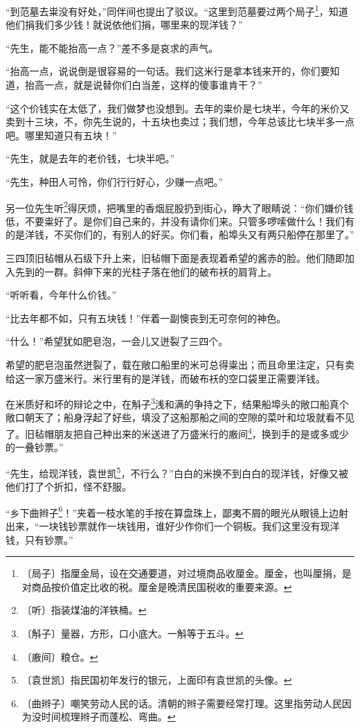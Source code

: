 \documentclass[12pt,UTF-8,openany]{ctexbook}
\begin{document}
\begin{normalsize}
    “到范墓去粜没有好处，”同伴间也提出了驳议。“这里到范墓要过两个局子\footnote{〔局子〕指厘金局，设在交通要道，对过境商品收厘金。厘金，也叫厘捐，是对商品按价值定比收的税。厘金是晚清民国税收的重要来源。}，知道他们捐我们多少钱！就说依他们捐，哪里来的现洋钱？”
    
    “先生，能不能抬高一点？”差不多是哀求的声气。
    
    “抬高一点，说说倒是很容易的一句话。我们这米行是拿本钱来开的，你们要知道，抬高一点，就是说替你们白当差，这样的傻事谁肯干？”
    
    “这个价钱实在太低了，我们做梦也没想到。去年的粜价是七块半，今年的米价又卖到十三块，不，你先生说的，十五块也卖过；我们想，今年总该比七块半多一点吧。哪里知道只有五块！”
    
    “先生，就是去年的老价钱，七块半吧。”
    
    “先生，种田人可怜，你们行行好心，少赚一点吧。”
    
    另一位先生听\footnote{〔听〕指装煤油的洋铁桶。}得厌烦，把嘴里的香烟屁股扔到街心，睁大了眼睛说：“你们嫌价钱低，不要粜好了。是你们自己来的，并没有请你们来。只管多啰嗦做什么！我们有的是洋钱，不买你们的，有别人的好买。你们看，船埠头又有两只船停在那里了。”
    
    三四顶旧毡帽从石级下升上来，旧毡帽下面是表现着希望的酱赤的脸。他们随即加入先到的一群。斜伸下来的光柱子落在他们的破布袄的肩背上。
    
    “听听看，今年什么价钱。”
    
    “比去年都不如，只有五块钱！”伴着一副懊丧到无可奈何的神色。
    
    “什么！”希望犹如肥皂泡，一会儿又迸裂了三四个。
    
    希望的肥皂泡虽然迸裂了，载在敞口船里的米可总得粜出；而且命里注定，只有卖给这一家万盛米行。米行里有的是洋钱，而破布袄的空口袋里正需要洋钱。
    
    在米质好和坏的辩论之中，在斛子\footnote{〔斛子〕量器，方形，口小底大。一斛等于五斗。}浅和满的争持之下，结果船埠头的敞口船真个敞口朝天了；船身浮起了好些，填没了这船那船之间的空隙的菜叶和垃圾就看不见了。旧毡帽朋友把自己种出来的米送进了万盛米行的廒间\footnote{〔廒间〕粮仓。}，换到手的是或多或少的一叠钞票。”
    
    “先生，给现洋钱，袁世凯\footnote{〔袁世凯〕指民国初年发行的银元，上面印有袁世凯的头像。}，不行么？”白白的米换不到白白的现洋钱，好像又被他们打了个折扣，怪不舒服。
    
    “乡下曲辫子\footnote{〔曲辫子〕嘲笑劳动人民的话。清朝的辫子需要经常打理。这里指劳动人民因为没时间梳理辫子而蓬松、弯曲。}！”夹着一枝水笔的手按在算盘珠上，鄙夷不屑的眼光从眼镜上边射出来，“一块钱钞票就作一块钱用，谁好少作你们一个铜板。我们这里没有现洋钱，只有钞票。”
    

\end{normalsize}
\end{document}
